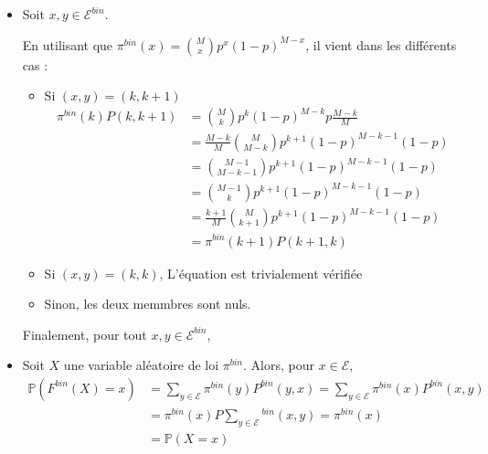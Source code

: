 \documentclass[a4paper,11pt]{article}
\def \P{\mathbb{P}}
\def \E{\mathcal{E}}
\begin{document}
\begin{itemize}
\item[\textbullet]
Soit $x,y \in \E^{bin}$.

En utilisant que $\pi^{bin}(x)  = \binom{M}{x}p^x(1-p)^{M-x}$, il vient dans les différents cas :

	\begin{itemize}
		\item 	Si $(x,y) = (k,k+1)$
			\begin{equation*}	
			\begin{split}
			\pi^{bin}(k)P(k,k+1) &= \binom{M}{k}p^k(1-p)^{M-k}p\frac{M-k}{M} \\
			&= \frac{M-k}{M}\binom{M}{M-k}p^{k+1}(1-p)^{M-k-1}(1-p)\\
			&= \binom{M-1}{M-k-1}p^{k+1}(1-p)^{M-k-1}(1-p)\\
			&= \binom{M-1}{k}p^{k+1}(1-p)^{M-k-1}(1-p)\\
			&= \frac{k+1}{M}\binom{M}{k+1}p^{k+1}(1-p)^{M-k-1}(1-p)\\
			&= \pi^{bin}(k+1)P(k+1,k) 
			\end{split}
			\end{equation*}
		\item   Si $(x,y) = (k,k)$, L'équation est trivialement vérifiée
		\item   Sinon, les deux memmbres sont nuls.
	\end{itemize}
		Finalement, pour tout $x,y \in \E^{bin}$, 
\begin{center}
\end{center}

\item[\textbullet]
Soit $X$ une variable aléatoire de loi $\pi^{bin}$. Alors, pour $x\in \E$,
\begin{equation*}
\begin{split}
 \P(F^{bin}(X)=x) &= \sum_{y\in\E}{\pi^{bin}(y)P^{bin}(y,x)}
		  = \sum_{y\in\E}{\pi^{bin}(x)P^{bin}(x,y)}\\
		  &= \pi^{bin}(x)P\sum_{y\in\E}{^{bin}(x,y)}
		  = \pi^{bin}(x)\\
		  &= \P(X=x) 
\end{split}
\end{equation*}
\begin{center}
\end{center}

\end{itemize}
\end{document}
